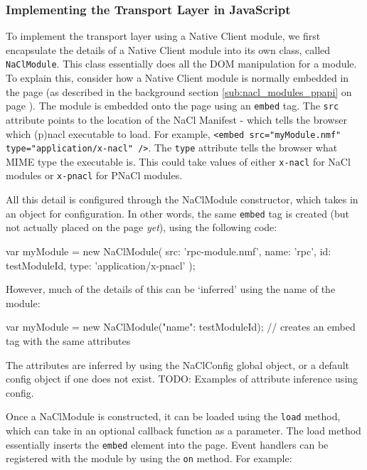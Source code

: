 \subsubsection{Implementing the Transport Layer in JavaScript} %
\label{ssub:implementing_the_transport_layer_in_javascript}
To implement the transport layer using a Native Client module, we first encapsulate the details of a Native Client module into its own class, called \lstinline{NaClModule}. This class essentially does all the DOM manipulation for a module. To explain this, consider how a Native Client module is normally embedded in the page (as described in the background section \ref{sub:nacl_modules_ppapi} on page \pageref{sub:nacl_modules_ppapi}). The module is embedded onto the page using an \lstinline{embed} tag. The \lstinline{src} attribute points to the location of the NaCl Manifest - which tells the browser which (p)nacl executable to load. For example, \lstinline{<embed src="myModule.nmf" type="application/x-nacl" />}. The \lstinline{type} attribute tells the browser what MIME type the executable is. This could take values of either \lstinline{x-nacl} for NaCl modules or \lstinline{x-pnacl} for PNaCl modules. 

All this detail is configured through the NaClModule constructor, which takes in an object for configuration. In other words, the same \lstinline{embed} tag is created (but not actually placed on the page \emph{yet}), using the following code:

\begin{code}
var myModule = new NaClModule({
  src: 'rpc-module.nmf', 
  name: 'rpc', 
  id: testModuleId, 
  type: 'application/x-pnacl'
});
\end{code}

However, much of the details of this can be `inferred' using the name of the module:

\begin{code}
var myModule = new NaClModule({"name": testModuleId});
// creates an embed tag with the same attributes
\end{code}

The attributes are inferred by using the NaClConfig global object, or a default config object if one does not exist. TODO: Examples of attribute inference using config.

Once a NaClModule is constructed, it can be loaded using the \lstinline{load} method, which can take in an optional callback function as a parameter. The load method essentially inserts the \lstinline{embed} element into the page. Event handlers can be registered with the module by using the \lstinline{on} method. For example:

